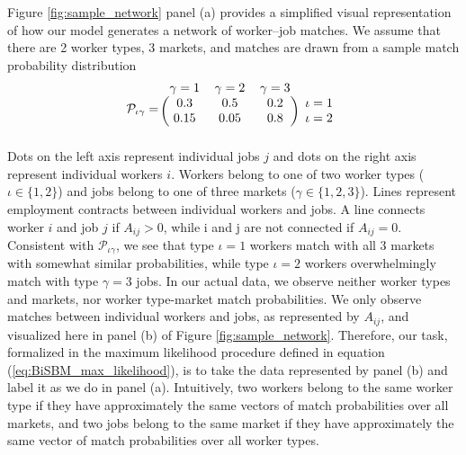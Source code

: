 \documentclass[12pt]{article}
\def\ig{\iota\gamma}
\def\g{\gamma}
\def\i{\iota}
\theoremstyle{definition}
\theoremstyle{plain}
\begin{document}
Figure \ref{fig:sample_network} panel (a) provides a simplified visual representation of how our model generates a network of worker--job matches. We assume that there are 2 worker types, 3 markets, and matches are drawn from a sample match probability distribution
\[\mathcal{P}_{\ig} = 
\begin{blockarray}{lccc}
\g=1	&\g=2	& \g=3	& 	\\
\begin{block}{(ccc)r}
0.3		& 0.5	& 0.2	& \i=1	\\
0.15	& 0.05	& 0.8	&  \i=2	\\ 
\end{block}
\end{blockarray}\]
Dots on the left axis represent individual jobs $j$ and dots on the right axis represent individual workers $i$. Workers belong to one of two worker types ($\i\in\{1,2\}$) and jobs belong to one of three markets ($\g\in\{1,2,3\}$).  Lines represent employment contracts between individual workers and jobs. A line connects worker $i$ and job $j$ if $A_{ij}>0$, while i and j are not connected if $A_{ij}=0$.  Consistent with $\mathcal{P}_{\ig}$, we see that type $\i=1$ workers match with all 3 markets with somewhat similar probabilities, while type $\i=2$ workers overwhelmingly match with type $\g=3$ jobs. In our actual data, we observe neither worker types and markets, nor worker type-market match probabilities. We only observe matches between individual workers and jobs, as represented by $A_{ij}$, and visualized here in panel (b) of Figure \ref{fig:sample_network}. Therefore, our task, formalized in the maximum likelihood procedure defined in equation (\ref{eq:BiSBM_max_likelihood}), is to take the data represented by panel (b) and label it as we do in panel (a). Intuitively, two workers belong to the same worker type if they have approximately the same vectors of match probabilities over all markets, and two jobs belong to the same market if they have approximately the same vector of match probabilities over all worker types.  
\end{document}
